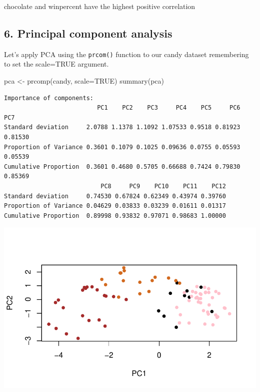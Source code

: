 \documentclass[
  letterpaper,
  DIV=11,
  numbers=noendperiod]{scrartcl}
\newenvironment{Shaded}{\begin{snugshade}}{\end{snugshade}}
\newcommand{\AttributeTok}[1]{\textcolor[rgb]{0.40,0.45,0.13}{#1}}
\newcommand{\ConstantTok}[1]{\textcolor[rgb]{0.56,0.35,0.01}{#1}}
\newcommand{\DecValTok}[1]{\textcolor[rgb]{0.68,0.00,0.00}{#1}}
\newcommand{\FunctionTok}[1]{\textcolor[rgb]{0.28,0.35,0.67}{#1}}
\newcommand{\NormalTok}[1]{\textcolor[rgb]{0.00,0.23,0.31}{#1}}
\newcommand{\OtherTok}[1]{\textcolor[rgb]{0.00,0.23,0.31}{#1}}
\newcommand{\SpecialCharTok}[1]{\textcolor[rgb]{0.37,0.37,0.37}{#1}}
\begin{document}
chocolate and winpercent have the highest positive correlation

\subsection{6. Principal component
analysis}\label{principal-component-analysis}

Let's apply PCA using the \texttt{prcom()} function to our candy dataset
remembering to set the scale=TRUE argument.

\begin{Shaded}
\begin{Highlighting}[]
\NormalTok{pca }\OtherTok{\textless{}{-}} \FunctionTok{prcomp}\NormalTok{(candy, }\AttributeTok{scale=}\ConstantTok{TRUE}\NormalTok{)}
\FunctionTok{summary}\NormalTok{(pca)}
\end{Highlighting}
\end{Shaded}

\begin{verbatim}
Importance of components:
                          PC1    PC2    PC3     PC4    PC5     PC6     PC7
Standard deviation     2.0788 1.1378 1.1092 1.07533 0.9518 0.81923 0.81530
Proportion of Variance 0.3601 0.1079 0.1025 0.09636 0.0755 0.05593 0.05539
Cumulative Proportion  0.3601 0.4680 0.5705 0.66688 0.7424 0.79830 0.85369
                           PC8     PC9    PC10    PC11    PC12
Standard deviation     0.74530 0.67824 0.62349 0.43974 0.39760
Proportion of Variance 0.04629 0.03833 0.03239 0.01611 0.01317
Cumulative Proportion  0.89998 0.93832 0.97071 0.98683 1.00000
\end{verbatim}

\begin{Shaded}
\end{Shaded}

\includegraphics{Class09_files/figure-pdf/unnamed-chunk-22-1.pdf}
\end{document}
